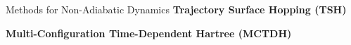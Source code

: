 \begin{frame}{Methods for Non-Adiabatic Dynamics}
    \textbf{Trajectory Surface Hopping (TSH)}
    \vspace{1.5em}
    
    \textbf{Multi-Configuration Time-Dependent Hartree (MCTDH)}
\end{frame}